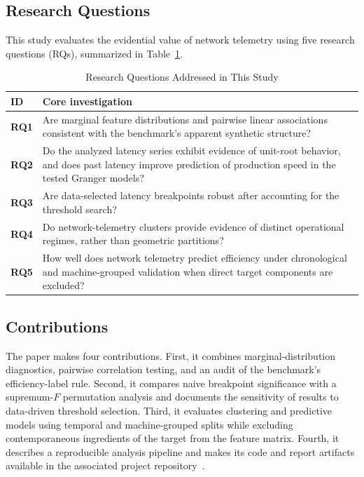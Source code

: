 \documentclass[conference]{IEEEtran}
\begin{document}
\subsection{Research Questions}
This study evaluates the evidential value of network telemetry using five research questions (RQs), summarized in Table~\ref{tab:rq}.

\begin{table}[t]
\caption{Research Questions Addressed in This Study}
\label{tab:rq}
\centering
\footnotesize
\begin{tabularx}{\columnwidth}{@{}l X@{}}
\toprule
\textbf{ID} & \textbf{Core investigation} \\
\midrule
\textbf{RQ1} & Are marginal feature distributions and pairwise linear associations consistent with the benchmark's apparent synthetic structure? \\
\textbf{RQ2} & Do the analyzed latency series exhibit evidence of unit-root behavior, and does past latency improve prediction of production speed in the tested Granger models? \\
\textbf{RQ3} & Are data-selected latency breakpoints robust after accounting for the threshold search? \\
\textbf{RQ4} & Do network-telemetry clusters provide evidence of distinct operational regimes, rather than geometric partitions? \\
\textbf{RQ5} & How well does network telemetry predict efficiency under chronological and machine-grouped validation when direct target components are excluded? \\
\bottomrule
\end{tabularx}
\end{table}

\subsection{Contributions}
The paper makes four contributions. First, it combines marginal-distribution diagnostics, pairwise correlation testing, and an audit of the benchmark's efficiency-label rule. Second, it compares naive breakpoint significance with a supremum-$F$ permutation analysis and documents the sensitivity of results to data-driven threshold selection. Third, it evaluates clustering and predictive models using temporal and machine-grouped splits while excluding contemporaneous ingredients of the target from the feature matrix. Fourth, it describes a reproducible analysis pipeline and makes its code and report artifacts available in the associated project repository~\cite{gangurde2026repository}.
\end{document}

